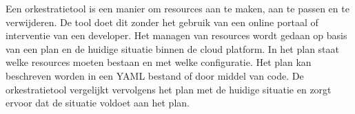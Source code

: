 Een orkestratietool is een manier om resources aan te maken, aan te passen en te verwijderen. De tool doet dit zonder het gebruik van een online portaal of interventie van een developer. Het managen van resources wordt gedaan op basis van een plan en de huidige situatie binnen de cloud platform. In het plan staat welke resources moeten bestaan en met welke configuratie. Het plan kan beschreven worden in een YAML bestand of door middel van code. De orkestratietool vergelijkt vervolgens het plan met de huidige situatie en zorgt ervoor dat de situatie voldoet aan het plan.